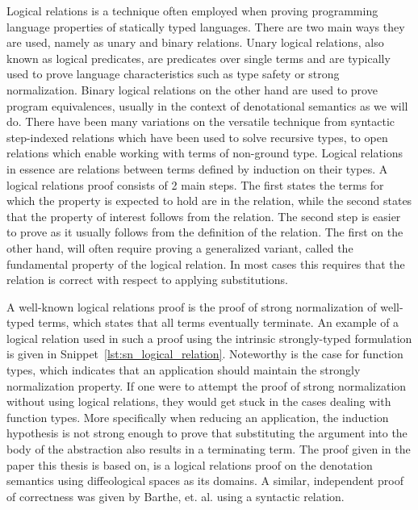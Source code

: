 \documentclass[11pt, final]{article}
\begin{document}
Logical relations is a technique often employed when proving programming language properties of statically typed languages\cite{skorstengaard2019introduction}. There are two main ways they are used, namely as unary and binary relations.
Unary logical relations, also known as logical predicates, are predicates over single terms and are typically used to prove language characteristics such as type safety or strong normalization.
Binary logical relations on the other hand are used to prove program equivalences, usually in the context of denotational semantics as we will do.
There have been many variations on the versatile technique from syntactic step-indexed relations which have been used to solve recursive types\cite{Ahmed2006}, to open relations which enable working with terms of non-ground type\cite{barthe2020versatility}\cite{huot2020correctness}.
Logical relations in essence are relations between terms defined by induction on their types.
A logical relations proof consists of 2 main steps.
The first states the terms for which the property is expected to hold are in the relation, while the second states that the property of interest follows from the relation.
The second step is easier to prove as it usually follows from the definition of the relation. The first on the other hand, will often require proving a generalized variant, called the fundamental property of the logical relation.
In most cases this requires that the relation is correct with respect to applying substitutions.

A well-known logical relations proof is the proof of strong normalization of well-typed terms, which states that all terms eventually terminate.
An example of a logical relation used in such a proof using the intrinsic strongly-typed formulation is given in Snippet~\ref{lst:sn_logical_relation}.
Noteworthy is the case for function types, which indicates that an application should maintain the strongly normalization property.
If one were to attempt the proof of strong normalization without using logical relations, they would get stuck in the cases dealing with function types.
More specifically when reducing an application, the induction hypothesis is not strong enough to prove that substituting the argument into the body of the abstraction also results in a terminating term.
The proof given in the paper this thesis is based on, is a logical relations proof on the denotation semantics using diffeological spaces as its domains\cite{huot2020correctness}.
A similar, independent proof of correctness was given by Barthe, et. al.\cite{barthe2020versatility} using a syntactic relation.
\end{document}
